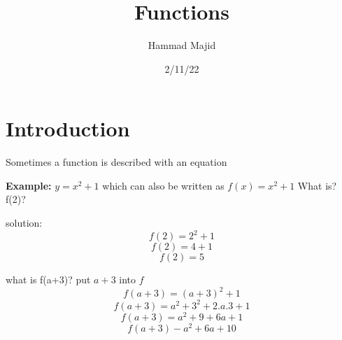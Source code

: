 \documentclass{article}
\title{Functions}
\author{Hammad Majid}
\date{2/11/22}
\begin{document}
\maketitle

\section*{Introduction}

    \linebreaktr
Sometimes a function is described with an equation

\textbf{Example:} $y = x^2 + 1$ which can also be written as $f(x) = x^2 + 1$
\linebreak
What is? f(2)?

solution:
    $$f(2) = 2^2 + 1$$
    $$f(2) = 4 + 1$$
    $$f(2) = 5$$

what is f(a+3)?
\linebreak
put $a + 3$ into $f$
$$f(a + 3) = (a + 3)^2 + 1$$
$$f(a + 3) = a^2 + 3^2 + 2.a.3 + 1$$
$$f(a + 3) = a^2 + 9 + 6a + 1$$
$$f(a + 3) - a^2 + 6a + 10$$
\end{document}
